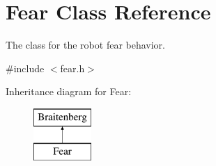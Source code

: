 \hypertarget{class_fear}{}\section{Fear Class Reference}
\label{class_fear}


The class for the robot fear behavior.  




{\ttfamily \#include $<$fear.\+h$>$}

Inheritance diagram for Fear\+:\begin{figure}[H]
\begin{center}
\leavevmode
\includegraphics[height=2.000000cm]{class_fear}
\end{center}
\end{figure}
